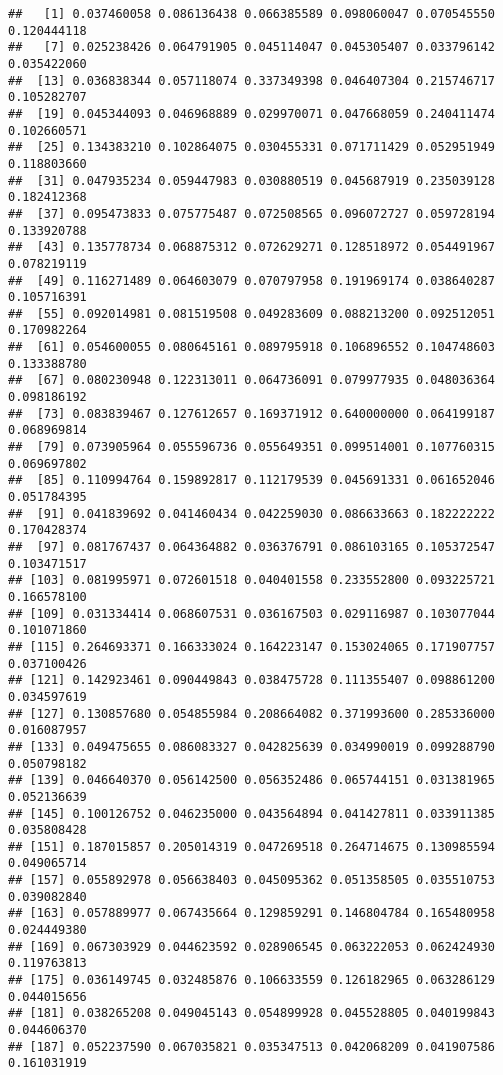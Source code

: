 \documentclass[
]{article}
\begin{document}
\begin{verbatim}
##   [1] 0.037460058 0.086136438 0.066385589 0.098060047 0.070545550 0.120444118
##   [7] 0.025238426 0.064791905 0.045114047 0.045305407 0.033796142 0.035422060
##  [13] 0.036838344 0.057118074 0.337349398 0.046407304 0.215746717 0.105282707
##  [19] 0.045344093 0.046968889 0.029970071 0.047668059 0.240411474 0.102660571
##  [25] 0.134383210 0.102864075 0.030455331 0.071711429 0.052951949 0.118803660
##  [31] 0.047935234 0.059447983 0.030880519 0.045687919 0.235039128 0.182412368
##  [37] 0.095473833 0.075775487 0.072508565 0.096072727 0.059728194 0.133920788
##  [43] 0.135778734 0.068875312 0.072629271 0.128518972 0.054491967 0.078219119
##  [49] 0.116271489 0.064603079 0.070797958 0.191969174 0.038640287 0.105716391
##  [55] 0.092014981 0.081519508 0.049283609 0.088213200 0.092512051 0.170982264
##  [61] 0.054600055 0.080645161 0.089795918 0.106896552 0.104748603 0.133388780
##  [67] 0.080230948 0.122313011 0.064736091 0.079977935 0.048036364 0.098186192
##  [73] 0.083839467 0.127612657 0.169371912 0.640000000 0.064199187 0.068969814
##  [79] 0.073905964 0.055596736 0.055649351 0.099514001 0.107760315 0.069697802
##  [85] 0.110994764 0.159892817 0.112179539 0.045691331 0.061652046 0.051784395
##  [91] 0.041839692 0.041460434 0.042259030 0.086633663 0.182222222 0.170428374
##  [97] 0.081767437 0.064364882 0.036376791 0.086103165 0.105372547 0.103471517
## [103] 0.081995971 0.072601518 0.040401558 0.233552800 0.093225721 0.166578100
## [109] 0.031334414 0.068607531 0.036167503 0.029116987 0.103077044 0.101071860
## [115] 0.264693371 0.166333024 0.164223147 0.153024065 0.171907757 0.037100426
## [121] 0.142923461 0.090449843 0.038475728 0.111355407 0.098861200 0.034597619
## [127] 0.130857680 0.054855984 0.208664082 0.371993600 0.285336000 0.016087957
## [133] 0.049475655 0.086083327 0.042825639 0.034990019 0.099288790 0.050798182
## [139] 0.046640370 0.056142500 0.056352486 0.065744151 0.031381965 0.052136639
## [145] 0.100126752 0.046235000 0.043564894 0.041427811 0.033911385 0.035808428
## [151] 0.187015857 0.205014319 0.047269518 0.264714675 0.130985594 0.049065714
## [157] 0.055892978 0.056638403 0.045095362 0.051358505 0.035510753 0.039082840
## [163] 0.057889977 0.067435664 0.129859291 0.146804784 0.165480958 0.024449380
## [169] 0.067303929 0.044623592 0.028906545 0.063222053 0.062424930 0.119763813
## [175] 0.036149745 0.032485876 0.106633559 0.126182965 0.063286129 0.044015656
## [181] 0.038265208 0.049045143 0.054899928 0.045528805 0.040199843 0.044606370
## [187] 0.052237590 0.067035821 0.035347513 0.042068209 0.041907586 0.161031919

\end{verbatim}
\end{document}
